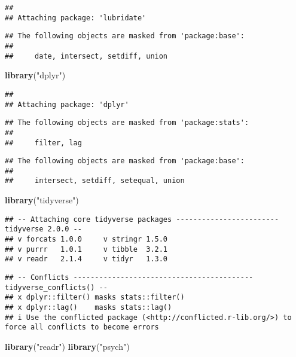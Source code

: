 \documentclass[
]{article}
\newenvironment{Shaded}{\begin{snugshade}}{\end{snugshade}}
\newcommand{\FunctionTok}[1]{\textcolor[rgb]{0.13,0.29,0.53}{\textbf{#1}}}
\newcommand{\NormalTok}[1]{#1}
\newcommand{\StringTok}[1]{\textcolor[rgb]{0.31,0.60,0.02}{#1}}
\begin{document}
\begin{verbatim}
## 
## Attaching package: 'lubridate'
\end{verbatim}

\begin{verbatim}
## The following objects are masked from 'package:base':
## 
##     date, intersect, setdiff, union
\end{verbatim}

\begin{Shaded}
\begin{Highlighting}[]
\FunctionTok{library}\NormalTok{(}\StringTok{"dplyr"}\NormalTok{)}
\end{Highlighting}
\end{Shaded}

\begin{verbatim}
## 
## Attaching package: 'dplyr'
\end{verbatim}

\begin{verbatim}
## The following objects are masked from 'package:stats':
## 
##     filter, lag
\end{verbatim}

\begin{verbatim}
## The following objects are masked from 'package:base':
## 
##     intersect, setdiff, setequal, union
\end{verbatim}

\begin{Shaded}
\begin{Highlighting}[]
\FunctionTok{library}\NormalTok{(}\StringTok{"tidyverse"}\NormalTok{)}
\end{Highlighting}
\end{Shaded}

\begin{verbatim}
## -- Attaching core tidyverse packages ------------------------ tidyverse 2.0.0 --
## v forcats 1.0.0     v stringr 1.5.0
## v purrr   1.0.1     v tibble  3.2.1
## v readr   2.1.4     v tidyr   1.3.0
\end{verbatim}

\begin{verbatim}
## -- Conflicts ------------------------------------------ tidyverse_conflicts() --
## x dplyr::filter() masks stats::filter()
## x dplyr::lag()    masks stats::lag()
## i Use the conflicted package (<http://conflicted.r-lib.org/>) to force all conflicts to become errors
\end{verbatim}

\begin{Shaded}
\begin{Highlighting}[]
\FunctionTok{library}\NormalTok{(}\StringTok{"readr"}\NormalTok{)}
\FunctionTok{library}\NormalTok{(}\StringTok{"psych"}\NormalTok{)}
\end{Highlighting}
\end{Shaded}
\end{document}
